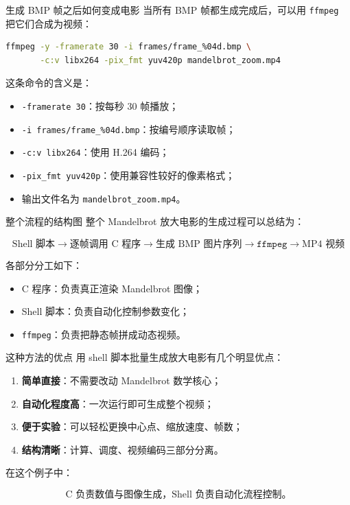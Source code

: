 \documentclass[aspectratio=169,11pt]{ctexbeamer}
\begin{document}
\begin{frame}[fragile]{生成 BMP 帧之后如何变成电影}
当所有 BMP 帧都生成完成后，可以用 \texttt{ffmpeg} 把它们合成为视频：

\begin{lstlisting}[language=bash]
ffmpeg -y -framerate 30 -i frames/frame_%04d.bmp \
       -c:v libx264 -pix_fmt yuv420p mandelbrot_zoom.mp4
\end{lstlisting}

\vspace{0.5em}
这条命令的含义是：

\begin{itemize}
  \item \texttt{-framerate 30}：按每秒 30 帧播放；
  \item \texttt{-i frames/frame\_\%04d.bmp}：按编号顺序读取帧；
  \item \texttt{-c:v libx264}：使用 H.264 编码；
  \item \texttt{-pix\_fmt yuv420p}：使用兼容性较好的像素格式；
  \item 输出文件名为 \texttt{mandelbrot\_zoom.mp4}。
\end{itemize}
\end{frame}

\begin{frame}[fragile]{整个流程的结构图}
整个 Mandelbrot 放大电影的生成过程可以总结为：

\[
\boxed{
\text{Shell 脚本}
\to
\text{逐帧调用 C 程序}
\to
\text{生成 BMP 图片序列}
\to
\texttt{ffmpeg}
\to
\text{MP4 视频}
}
\]

\vspace{0.8em}
各部分分工如下：

\begin{itemize}
  \item C 程序：负责真正渲染 Mandelbrot 图像；
  \item Shell 脚本：负责自动化控制参数变化；
  \item \texttt{ffmpeg}：负责把静态帧拼成动态视频。
\end{itemize}
\end{frame}

\begin{frame}[fragile]{这种方法的优点}
用 shell 脚本批量生成放大电影有几个明显优点：

\begin{enumerate}
  \item \textbf{简单直接}：不需要改动 Mandelbrot 数学核心；
  \item \textbf{自动化程度高}：一次运行即可生成整个视频；
  \item \textbf{便于实验}：可以轻松更换中心点、缩放速度、帧数；
  \item \textbf{结构清晰}：计算、调度、视频编码三部分分离。
\end{enumerate}

\vspace{0.5em}
在这个例子中：

\[
\text{C 负责数值与图像生成，Shell 负责自动化流程控制。}
\]
\end{frame}
\end{document}
